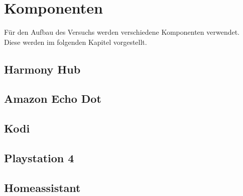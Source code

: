 \section{Komponenten}\label{sec:komponenten}
Für den Aufbau des Versuchs werden verschiedene Komponenten verwendet.
Diese werden im folgenden Kapitel vorgestellt.

\subsection{Harmony Hub}\label{sec:harmony}


\subsection{Amazon Echo Dot}\label{sec:komp-echo}

\subsection{Kodi}\label{sec:komp-kodi}

\subsection{Playstation 4}\label{sec:komp-playstation}

\subsection{Homeassistant}\label{sec:kom-homeassistant}

